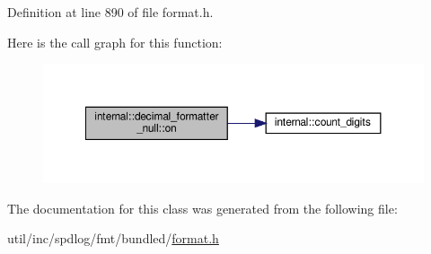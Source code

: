 Definition at line 890 of file format.\+h.

Here is the call graph for this function\+:
\nopagebreak
\begin{figure}[H]
\begin{center}
\leavevmode
\includegraphics[width=350pt]{classinternal_1_1decimal__formatter__null_ad80412ef085aa07ed5619f4b731c290f_cgraph}
\end{center}
\end{figure}


The documentation for this class was generated from the following file\+:\begin{DoxyCompactItemize}
\item 
util/inc/spdlog/fmt/bundled/\hyperlink{format_8h}{format.\+h}\end{DoxyCompactItemize}
